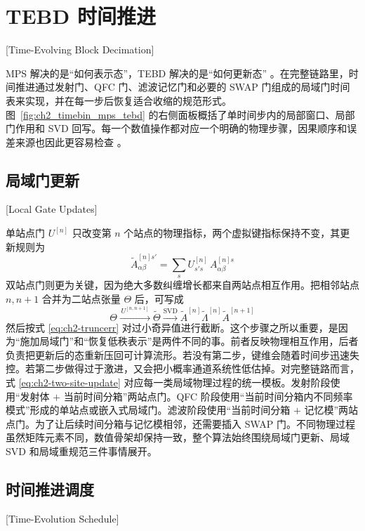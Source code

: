 \section{TEBD 时间推进}[Time-Evolving Block Decimation]

MPS 解决的是“如何表示态”，TEBD 解决的是“如何更新态” \cite{Vidal2004TEBD,Paeckel2019TimeEvolutionMPS}。在完整链路里，时间推进通过发射门、QFC 门、滤波记忆门和必要的 SWAP 门组成的局域门时间表来实现，并在每一步后恢复适合收缩的规范形式。图~\ref{fig:ch2_timebin_mps_tebd} 的右侧面板概括了单时间步内的局部窗口、局部门作用和 SVD 回写。每一个数值操作都对应一个明确的物理步骤，因果顺序和误差来源也因此更容易检查 \cite{Vidal2004TEBD,Paeckel2019TimeEvolutionMPS}。

\subsection{局域门更新}[Local Gate Updates]

单站点门 $U^{[n]}$ 只改变第 $n$ 个站点的物理指标，两个虚拟键指标保持不变，其更新规则为
\begin{equation}
\tilde A^{[n]s'}_{\alpha\beta}
=
\sum_s U^{[n]}_{s's}\,A^{[n]s}_{\alpha\beta}
\label{eq:ch2-one-site-update}
\end{equation}
双站点门则更为关键，因为绝大多数纠缠增长都来自两站点相互作用。把相邻站点 $n,n+1$ 合并为二站点张量 $\Theta$ 后，可写成
\begin{equation}
\Theta
\xrightarrow{\,U^{[n,n+1]}\,}
\tilde\Theta
\xrightarrow{\mathrm{SVD}}
\tilde A^{[n]}\tilde\Lambda^{[n]}\tilde A^{[n+1]}
\label{eq:ch2-two-site-update}
\end{equation}
然后按式 \eqref{eq:ch2-truncerr} 对过小奇异值进行截断。这个步骤之所以重要，是因为“施加局域门”和“恢复低秩表示”是两件不同的事。前者反映物理相互作用，后者负责把更新后的态重新压回可计算流形。若没有第二步，键维会随着时间步迅速失控。若第二步做得过于激进，又会把小概率通道系统性低估掉。对完整链路而言，式 \eqref{eq:ch2-two-site-update} 对应每一类局域物理过程的统一模板。发射阶段使用“发射体 $+$ 当前时间分箱”两站点门。QFC 阶段使用“当前时间分箱内不同频率模式”形成的单站点或嵌入式局域门。滤波阶段使用“当前时间分箱 $+$ 记忆模”两站点门。为了让后续时间分箱与记忆模相邻，还需要插入 SWAP 门。不同物理过程虽然矩阵元素不同，数值骨架却保持一致，整个算法始终围绕局域门更新、局域 SVD 和局域重规范三件事情展开。

\subsection{时间推进调度}[Time-Evolution Schedule]

